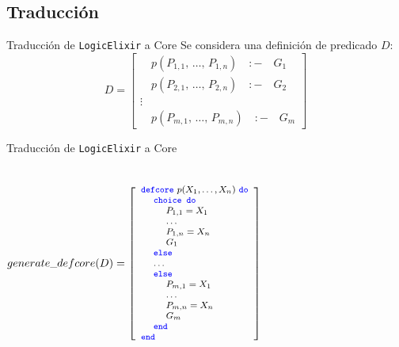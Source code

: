 \documentclass[14pt,aspectratio=169]{beamer}
\begin{document}
\subsection{Traducción}
\begin{frame}{Traducción de \texttt{LogicElixir} a Core}
  Se considera una definición de predicado $D$:
  \begin{equation*}
    D =
    \begin{bmatrix}
      \quad p(P_{1,1},\, \ldots,\, P_{1,n}) \quad :- \quad G_1\\
      \quad p(P_{2,1},\, \ldots,\, P_{2,n}) \quad :- \quad G_2\\
      \vdots \\
      \quad p(P_{m,1},\, \ldots,\, P_{m,n}) \quad :- \quad G_m
    \end{bmatrix}
  \end{equation*}
\end{frame}

\begin{frame}{Traducción de \texttt{LogicElixir} a Core}
  \begin{columns}
    \begin{align*}
      \footnotesize generate\_defcore(D) = \left[
        \begin{array}{lcr}
          \textcolor{blue}{\texttt{defcore}\ } p(X_1, \ldots, X_n) \textcolor{blue}{\ \texttt{do}} \\
          \ \ \ \ \textcolor{blue}{\texttt{choice do}} \\
          \ \ \ \ \ \ \ \ P_{1,1} = X_1 \\
          \ \ \ \ \ \ \ \ \ldots \\
          \ \ \ \ \ \ \ \ P_{1,n} = X_n \\
          \ \ \ \ \ \ \ \ G_1\\
          \ \ \ \ \textcolor{blue}{\texttt{else}} \\
          \ \ \ \ \ldots \\
          \ \ \ \ \textcolor{blue}{\texttt{else}} \\
          \ \ \ \ \ \ \ \ P_{m,1} = X_1 \\
          \ \ \ \ \ \ \ \ \ldots \\
          \ \ \ \ \ \ \ \ P_{m,n} = X_n \\
          \ \ \ \ \ \ \ \ G_m\\
          \ \ \ \ \textcolor{blue}{\texttt{end}} \\
          \textcolor{blue}{\texttt{end}}
        \end{array}
      \right]
    \end{align*}
  \end{columns}
\end{frame}
\end{document}
